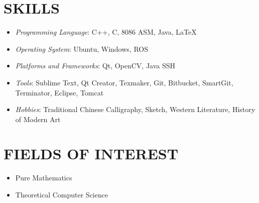 \documentclass[margin, 10pt]{res} %
\begin{document}
\begin{resume}
\section{SKILLS}
\begin{itemize}
\item {\sl Programming Language}: C++, C, 8086 ASM, Java, \LaTeX
\item {\sl Operating System}: Ubuntu, Windows, ROS
\item {\sl Platforms and Frameworks}: Qt, OpenCV, Java SSH
\item {\sl Tools}: Sublime Text, Qt Creator, Texmaker, Git, Bitbucket, SmartGit, Terminator, Eclipse, Tomcat
\item {\sl Hobbies}: Traditional Chinese Calligraphy, Sketch, Western Literature, History of Modern Art
\end{itemize}

\section{FIELDS OF INTEREST}
\begin{itemize}
\item Pure Mathematics
\item Theoretical Computer Science
\end{itemize}

\end{resume}
\end{document}
